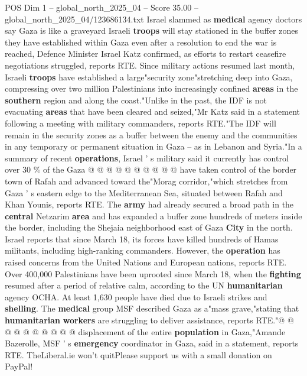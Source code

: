 \begin{textsample}{POS Dim 1 – global\_north\_2025\_04 – Score 35.00 – global\_north\_2025\_04/123686134.txt}  \label{ex:f1_pos_341}
Israel slammed as \textbf{medical} agency doctors say Gaza is like a graveyard Israeli \textbf{troops} will stay stationed in the buffer zones they have established within Gaza even after a resolution to end the war is reached, Defence Minister Israel Katz confirmed, as efforts to restart ceasefire negotiations struggled, reports RTE.
Since military actions resumed last month, Israeli \textbf{troops} have established a large"security zone"stretching deep into Gaza, compressing over two million Palestinians into increasingly confined \textbf{areas} in the \textbf{southern} region and along the coast."Unlike in the past, the IDF is not evacuating \textbf{areas} that have been cleared and seized,"Mr Katz said in a statement following a meeting with military commanders, reports RTE."The IDF will remain in the security zones as a buffer between the enemy and the communities in any temporary or permanent situation in Gaza -- as in Lebanon and Syria."In a summary of recent \textbf{operations}, Israel ' s military said it currently has control over 30 \% of the Gaza @ @ @ @ @ @ @ @ @ @ have taken control of the border town of Rafah and advanced toward the"Morag corridor,"which stretches from Gaza ' s eastern edge to the Mediterranean Sea, situated between Rafah and Khan Younis, reports RTE.
The \textbf{army} had already secured a broad path in the \textbf{central} Netzarim \textbf{area} and has expanded a buffer zone hundreds of meters inside the border, including the Shejaia neighborhood east of Gaza \textbf{City} in the north.
Israel reports that since March 18, its forces have killed hundreds of Hamas militants, including high-ranking commanders.
However, the \textbf{operation} has raised concerns from the United Nations and European nations, reports RTE.
Over 400,000 Palestinians have been uprooted since March 18, when the \textbf{fighting} resumed after a period of relative calm, according to the UN \textbf{humanitarian} agency OCHA.
At least 1,630 people have died due to Israeli strikes and \textbf{shelling}.
The \textbf{medical} group MSF described Gaza as a"mass grave,"stating that \textbf{humanitarian} \textbf{workers} are struggling to deliver assistance, reports RTE."@ @ @ @ @ @ @ @ @ @ displacement of the entire \textbf{population} in Gaza,"Amande Bazerolle, MSF ' s \textbf{emergency} coordinator in Gaza, said in a statement, reports RTE.
TheLiberal.ie won't quitPlease support us with a small donation on PayPal!

\end{textsample}
